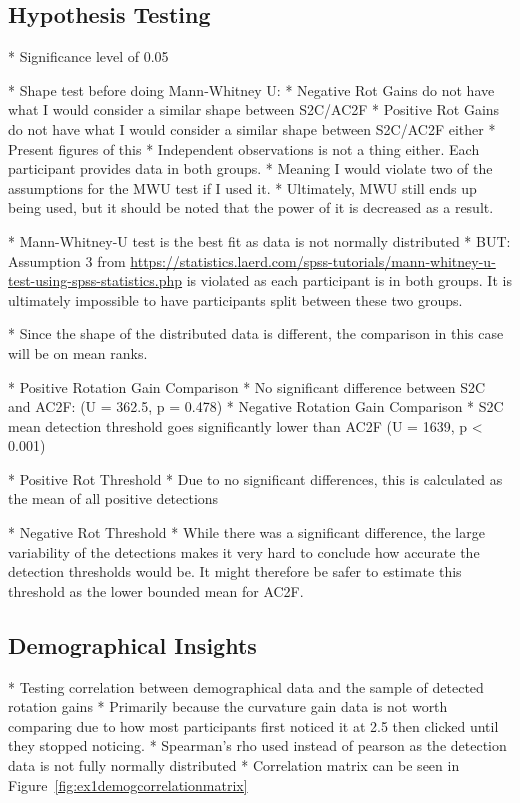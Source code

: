 \subsection{Hypothesis Testing}
* Significance level of 0.05

* Shape test before doing Mann-Whitney U:
   * Negative Rot Gains do not have what I would consider a similar shape between S2C/AC2F
   * Positive Rot Gains do not have what I would consider a similar shape between S2C/AC2F either
   * Present figures of this
* Independent observations is not a thing either. Each participant provides data in both groups. 
* Meaning I would violate two of the assumptions for the MWU test if I used it.
* Ultimately, MWU still ends up being used, but it should be noted that the power of it is decreased as a result. 

* Mann-Whitney-U test is the best fit as data is not normally distributed
   * BUT: Assumption 3 from \url{https://statistics.laerd.com/spss-tutorials/mann-whitney-u-test-using-spss-statistics.php} is violated as each participant is in both groups. It is ultimately impossible to have participants split between these two groups. 

* Since the shape of the distributed data is different, the comparison in this case will be on mean ranks. 

* Positive Rotation Gain Comparison
   * No significant difference between S2C and AC2F: (U = 362.5, p = 0.478)
* Negative Rotation Gain Comparison
   * S2C mean detection threshold goes significantly lower than AC2F (U = 1639, p < 0.001)
   
* Positive Rot Threshold
   * Due to no significant differences, this is calculated as the mean of all positive detections
   
* Negative Rot Threshold
   * While there was a significant difference, the large variability of the detections makes it very hard to conclude how accurate the detection thresholds would be. It might therefore be safer to estimate this threshold as the lower bounded mean for AC2F.

\subsection{Demographical Insights}
* Testing correlation between demographical data and the sample of detected rotation gains
   * Primarily because the curvature gain data is not worth comparing due to how most participants first noticed it at 2.5 then clicked until they stopped noticing. 
* Spearman's rho used instead of pearson as the detection data is not fully normally distributed
* Correlation matrix can be seen in Figure~\ref{fig:ex1demogcorrelationmatrix}

